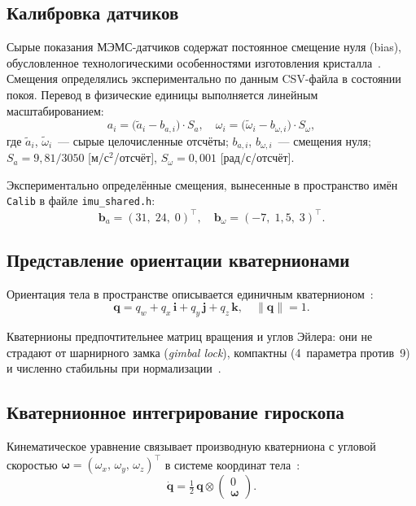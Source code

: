 \documentclass[../main.tex]{subfiles}
\begin{document}
\subsection{Калибровка датчиков}

Сырые показания МЭМС-датчиков содержат постоянное смещение нуля (bias),
обусловленное технологическими особенностями изготовления
кристалла~\cite{titterton2004}. Смещения определялись экспериментально по
данным CSV-файла в состоянии покоя. Перевод в физические единицы выполняется
линейным масштабированием:
\begin{equation}
    a_i = \bigl(\tilde{a}_i - b_{a,i}\bigr) \cdot S_a, \quad
    \omega_i = \bigl(\tilde{\omega}_i - b_{\omega,i}\bigr) \cdot S_\omega,
    \label{eq:calib}
\end{equation}
где $\tilde{a}_i$, $\tilde{\omega}_i$~--- сырые целочисленные отсчёты;
$b_{a,i}$, $b_{\omega,i}$~--- смещения нуля;
$S_a = 9{,}81/3050$ [м/с$^2$/отсчёт],
$S_\omega = 0{,}001$ [рад/с/отсчёт].
 
Экспериментально определённые смещения, вынесенные в пространство имён
\texttt{Calib} в файле \texttt{imu\_shared.h}:
\begin{equation}
    \mathbf{b}_a = (31,\; 24,\; 0)^\top, \quad
    \mathbf{b}_\omega = (-7,\; 1{,}5,\; 3)^\top.
    \label{eq:biases}
\end{equation}


\subsection{Представление ориентации кватернионами}

Ориентация тела в пространстве описывается единичным
кватернионом~\cite{kuipers1999}:
\begin{equation}
    \mathbf{q} = q_w + q_x\,\mathbf{i} + q_y\,\mathbf{j} + q_z\,\mathbf{k},
    \quad \|\mathbf{q}\| = 1.
    \label{eq:quat}
\end{equation}
 
Кватернионы предпочтительнее матриц вращения и углов Эйлера: они не страдают
от шарнирного замка (\textit{gimbal lock}), компактны (4~параметра против~9)
и численно стабильны при нормализации~\cite{kuipers1999}.


\subsection{Кватернионное интегрирование гироскопа}
 
Кинематическое уравнение связывает производную кватерниона с угловой скоростью
$\bm{\omega} = (\omega_x,\,\omega_y,\,\omega_z)^\top$ в системе координат
тела~\cite{mahony2008}:
\begin{equation}
    \dot{\mathbf{q}} = \tfrac{1}{2}\,\mathbf{q} \otimes
    \begin{pmatrix} 0 \\ \bm{\omega} \end{pmatrix}.
    \label{eq:qdot}
\end{equation}
 
\end{document}
